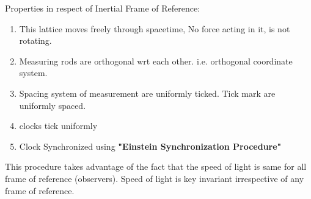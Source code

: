 \documentclass[11pt,a4paper]{article}
\begin{document}
\begin{enumerate}
\begin{enumerate}
\begin{enumerate}
                                    Properties in respect of Inertial Frame of Reference:
                                    \begin{enumerate}
                                          \item This lattice moves freely through spacetime, No force acting in it, is not rotating.
                                          \item Measuring rods are orthogonal wrt each other. i.e. orthogonal coordinate system.
                                          \item Spacing system of measurement are uniformly ticked. Tick mark are uniformly spaced.
                                          \item clocks tick uniformly
                                          \item Clock Synchronized using \textbf{"Einstein Synchronization Procedure"}
                                    \end{enumerate}
                                    This procedure takes advantage of the fact that the speed of light is same for all frame of reference (observers). Speed of light is key invariant irrespective of any frame of reference.
                                    \begin{figure}[H]
                                          \centering
\end{figure}
\end{enumerate}
\end{enumerate}
\end{enumerate}
\end{document}
